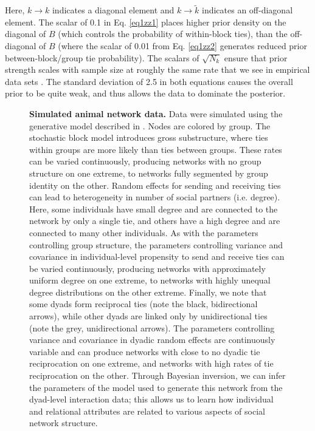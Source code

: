 \documentclass[Afour,sageh,times]{sagej}
\begin{document}
Here, $k \to k$ indicates a diagonal element and $k \to \tilde k$ indicates an off-diagonal element. 
The scalar of 0.1 in Eq. \ref{eq1zz1} places higher prior density on the diagonal of $B$ (which controls the probability of within-block ties), than the off-diagonal of $B$ (where the scalar of 0.01 from Eq. \ref{eq1zz2} generates reduced prior between-block/group tie probability). 
The scalars of $\sqrt{N_k}$ ensure that prior strength scales with sample size at roughly the same rate that we see in empirical data sets \citep{powerready2021}. 
The standard deviation of 2.5 in both equations causes the overall prior to be quite weak, and thus allows the data to dominate the posterior. 


\begin{figure}[t]
\caption{\textbf{Simulated animal network data.} Data were simulated using the generative model described in \citet{ross2022modelling}. Nodes are colored by group. The stochastic block model introduces gross substructure, where ties within groups are more likely than ties between groups. These rates can be varied continuously, producing networks with no group structure on one extreme, to networks fully segmented by group identity on the other. Random effects for sending and receiving ties can lead to heterogeneity in  number of social partners (i.e. degree). Here, some individuals have small degree and are connected to the network by only a single tie, and others have a high degree and are connected to many other individuals. As with the parameters controlling group structure, the parameters controlling variance and covariance in individual-level propensity to send and receive ties can be varied continuously, producing networks with approximately uniform degree on one extreme, to networks with highly unequal degree distributions on the other extreme. Finally, we note that some dyads form reciprocal ties (note the black, bidirectional arrows), while other dyads are linked only by unidirectional ties (note the grey, unidirectional arrows). The parameters controlling variance and covariance in dyadic random effects are continuously variable and can produce networks with close to no dyadic tie reciprocation on one extreme, and networks with high rates of tie reciprocation on the other. Through Bayesian inversion, we can infer the parameters of the model used to generate this network from the dyad-level interaction data; this allows us to learn how individual and relational attributes are related to various aspects of social network structure. }\label{examplenet}
\centering

\end{figure}
\end{document}
